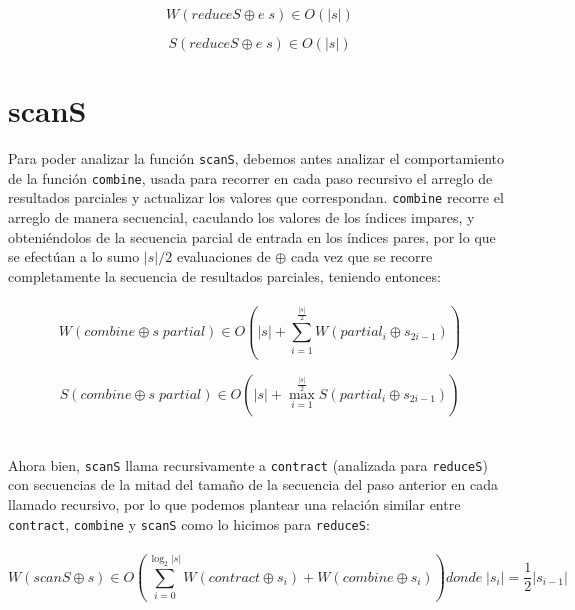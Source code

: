 \documentclass[a4paper,10pt]{article}
\begin{document}
		\begin{equation*}
			W \left( reduceS \oplus e \;  s \right) \in O \left( \vert s \vert \right)
		\end{equation*}
		
		\begin{equation*}
			S \left( reduceS \oplus e \; s \right) \in O \left( \vert s \vert \right)
		\end{equation*}
	
\pagebreak
	\section*{\Large scanS}
		Para poder analizar la función \texttt{scanS}, debemos antes analizar el comportamiento de la función \texttt{combine}, usada para recorrer en cada paso recursivo el arreglo de resultados parciales y actualizar los valores que correspondan.
		\texttt{combine} recorre el arreglo de manera secuencial, caculando los valores de los índices impares, y obteniéndolos de la secuencia parcial de entrada en los índices pares,  por lo que se efectúan a lo sumo $\vert s \vert / 2$ evaluaciones de $\oplus$ cada vez que se recorre completamente la secuencia de resultados parciales, teniendo entonces: 
\\
\\
		\begin{equation*}
			W \left( combine \oplus s \; partial \right) \in O \left( \vert s \vert + \sum_{i=1}^{\frac{\vert s \vert}{2}} W \left( partial_{i} \oplus s_{2i - 1} \right) \right)
		\end{equation*}

		\begin{equation*}
			S \left( combine \oplus s \; partial \right) \in	O \left( \vert s \vert + \max_{i=1}^{\frac{\vert s \vert}{2}} S \left( partial_{i} \oplus s_{2i - 1} \right) \right)
		\end{equation*}
\\
\\
		Ahora bien, \texttt{scanS} llama recursivamente a \texttt{contract} (analizada para \texttt{reduceS}) con secuencias de la mitad del tamaño de la secuencia del paso anterior en cada llamado recursivo, por lo que podemos plantear una relación similar entre \texttt{contract}, \texttt{combine} y \texttt{scanS} como lo hicimos para \texttt{reduceS}:
\\
\\	
	\begin{equation*}
		W \left( scanS \oplus s \right) \in O \left(\sum_{i=0}^{\log_2 \vert s \vert} W \left( contract \oplus s_i \right) + W \left( combine \oplus s_i \right) \right) donde \; \vert s_i\vert = \frac{1}{2} \vert s_{i-1} \vert
	\end{equation*}
\end{document}
